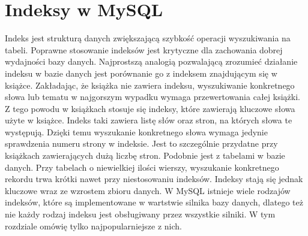 \section{Indeksy w MySQL}
Indeks jest strukturą danych zwiększającą szybkość operacji wyszukiwania na tabeli. Poprawne stosowanie indeksów jest krytyczne dla zachowania dobrej wydajności bazy danych.
Najprostszą analogią pozwalającą zrozumieć działanie indeksu w bazie danych jest porównanie go z indeksem znajdującym się w książce. Zakładając, że książka nie zawiera indeksu, wyszukiwanie konkretnego słowa lub tematu w najgorszym wypadku wymaga przewertowania całej książki. Z tego powodu w książkach stosuje się indeksy, które zawierają kluczowe słowa użyte w książce. Indeks taki zawiera listę słów oraz stron, na których słowa te występują. Dzięki temu wyszukanie konkretnego słowa wymaga jedynie sprawdzenia numeru strony w indeksie. Jest to szczególnie przydatne przy książkach zawierających dużą liczbę stron. Podobnie jest z tabelami w bazie danych. Przy tabelach o niewielkiej ilości wierszy, wyszukanie konkretnego rekordu trwa krótki nawet przy niestosowaniu indeksów. Indeksy stają się jednak kluczowe wraz ze wzrostem zbioru danych.
W MySQL istnieje wiele rodzajów indeksów, które są implementowane w wartstwie silnika bazy danych, dlatego też nie każdy rodzaj indeksu jest obsługiwany przez wszystkie silniki. W tym rozdziale omówię tylko najpopularniejsze z nich.


